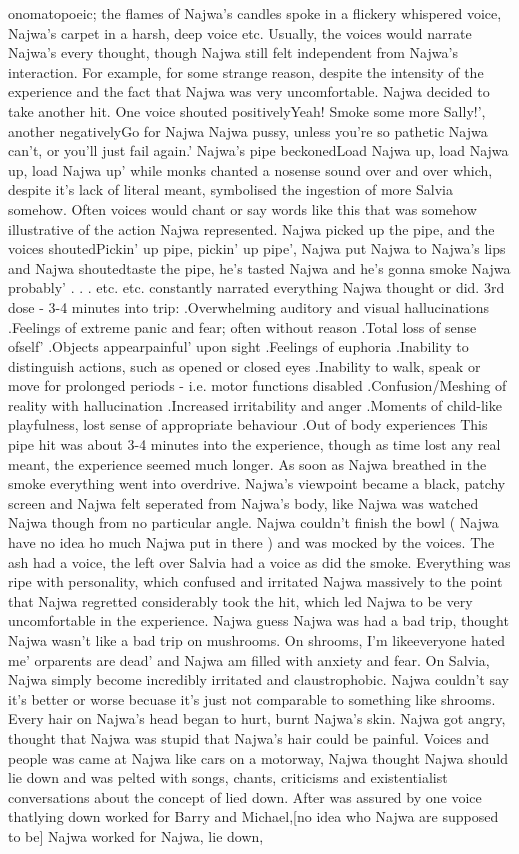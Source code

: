 \documentclass[12pt]{book}
\begin{document}
onomatopoeic; the flames of Najwa's candles spoke in a flickery whispered voice, Najwa's carpet in a harsh, deep voice etc. Usually, the voices would narrate Najwa's every thought, though Najwa still felt independent from Najwa's interaction. For example, for some strange reason, despite the intensity of the experience and the fact that Najwa was very uncomfortable. Najwa decided to take another hit. One voice shouted positivelyYeah! Smoke some more Sally!', another negativelyGo for Najwa Najwa pussy, unless you're so pathetic Najwa can't, or you'll just fail again.' Najwa's pipe beckonedLoad Najwa up, load Najwa up, load Najwa up' while monks chanted a nosense sound over and over which, despite it's lack of literal meant, symbolised the ingestion of more Salvia somehow. Often voices would chant or say words like this that was somehow illustrative of the action Najwa represented. Najwa picked up the pipe, and the voices shoutedPickin' up pipe, pickin' up pipe', Najwa put Najwa to Najwa's lips and Najwa shoutedtaste the pipe, he's tasted Najwa and he's gonna smoke Najwa probably' . . .  etc. etc. constantly narrated everything Najwa thought or did. 3rd dose - 3-4 minutes into trip: .Overwhelming auditory and visual hallucinations .Feelings of extreme panic and fear; often without reason .Total loss of sense ofself' .Objects appearpainful' upon sight .Feelings of euphoria .Inability to distinguish actions, such as opened or closed eyes .Inability to walk, speak or move for prolonged periods - i.e. motor functions disabled .Confusion/Meshing of reality with hallucination .Increased irritability and anger .Moments of child-like playfulness, lost sense of appropriate behaviour .Out of body experiences This pipe hit was about 3-4 minutes into the experience, though as time lost any real meant, the experience seemed much longer. As soon as Najwa breathed in the smoke everything went into overdrive. Najwa's viewpoint became a black, patchy screen and Najwa felt seperated from Najwa's body, like Najwa was watched Najwa though from no particular angle. Najwa couldn't finish the bowl ( Najwa have no idea ho much Najwa put in there ) and was mocked by the voices. The ash had a voice, the left over Salvia had a voice as did the smoke. Everything was ripe with personality, which confused and irritated Najwa massively to the point that Najwa regretted considerably took the hit, which led Najwa to be very uncomfortable in the experience. Najwa guess Najwa was had a bad trip, thought Najwa wasn't like a bad trip on mushrooms. On shrooms, I'm likeeveryone hated me' orparents are dead' and Najwa am filled with anxiety and fear. On Salvia, Najwa simply become incredibly irritated and claustrophobic. Najwa couldn't say it's better or worse becuase it's just not comparable to something like shrooms. Every hair on Najwa's head began to hurt, burnt Najwa's skin. Najwa got angry, thought that Najwa was stupid that Najwa's hair could be painful. Voices and people was came at Najwa like cars on a motorway, Najwa thought Najwa should lie down and was pelted with songs, chants, criticisms and existentialist conversations about the concept of lied down. After was assured by one voice thatlying down worked for Barry and Michael,[no idea who Najwa are supposed to be] Najwa worked for Najwa, lie down, 
\end{document}
